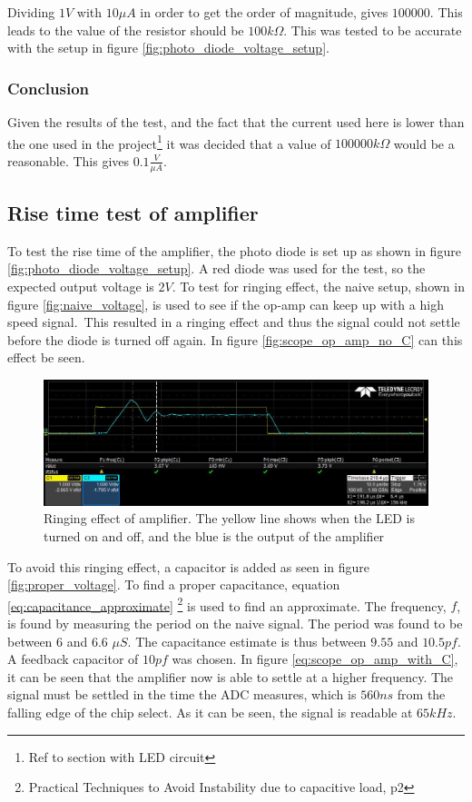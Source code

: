 Dividing $1 V$ with $10 \mu A$ in order to get the order of magnitude, gives $100 000$. This leads to the value of the resistor should be $100 k\Omega$.
This was tested to be accurate with the setup in figure \ref{fig:photo_diode_voltage_setup}.


\subsubsection{Conclusion}
Given the results of the test, and the fact that the current used here is lower than the one used in the project\footnote{Ref to section with LED circuit} it was decided that a value of $100 000 k\Omega$ would be a reasonable. This gives $0.1 \frac{V}{\mu A}$.

\subsection{Rise time test of amplifier} \label{sec:rise_time_test}

To test the rise time of the amplifier, the photo diode is set up as shown in figure \ref{fig:photo_diode_voltage_setup}.
A red diode was used for the test, so the expected output voltage is $2 V$.
To test for ringing effect, the naive setup, shown in figure \ref{fig:naive_voltage}, 
is used to see if the op-amp can keep up with a high speed signal.\
This resulted in a ringing effect and thus the signal could not settle before the diode is turned off again.
In figure \ref{fig:scope_op_amp_no_C} can this effect be seen.

\begin{figure}[h]
\includegraphics[width=\linewidth]{img/amp_test_ringing2.jpg}
\caption{Ringing effect of amplifier. The yellow line shows when the LED is turned on and off, and the blue is the output of the amplifier}
\label{fig::scope_op_amp_no_C}
\end{figure}

To avoid this ringing effect, a capacitor is added as seen in figure \ref{fig:proper_voltage}.
To find a proper capacitance, equation \ref{eq:capacitance_approximate}
\footnote{Practical Techniques to Avoid Instability due to capacitive load, p2}
is used to find an approximate.
The frequency, $f$, is found by measuring the period on the naive signal.
The period was found to be between $6$ and $6.6$ $\mu S$.
The capacitance estimate is thus between $9.55$ and $10.5 pf$. 
A feedback capacitor of $10 pf$ was chosen.
In figure \ref{eq:scope_op_amp_with_C}, it can be seen that the amplifier now is able to settle at a higher frequency.
The signal must be settled in the time the ADC measures, which is $560 ns$ from the falling edge of the chip select.
As it can be seen, the signal is readable at $65 kHz$.

